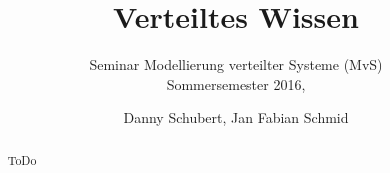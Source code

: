 \documentclass{llncs}
\begin{document}
\title{Verteiltes Wissen}
\subtitle{\small{ Seminar Modellierung verteilter Systeme (MvS)\\ Sommersemester 2016,}}
\author{Danny Schubert, Jan Fabian Schmid\\}
\maketitle

\begin{abstract}
ToDo
\end{abstract}












\end{document}
